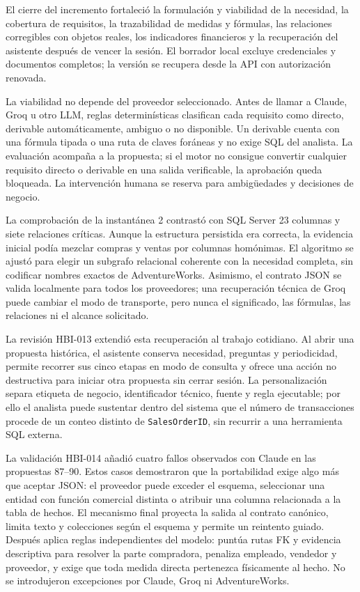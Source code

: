\documentclass[11pt,letterpaper]{article}
\newcommand{\file}[1]{\texttt{#1}}
\begin{document}
El cierre del incremento fortaleció la formulación y viabilidad de la necesidad, la cobertura de requisitos, la trazabilidad de medidas y fórmulas, las relaciones corregibles con objetos reales, los indicadores financieros y la recuperación del asistente después de vencer la sesión. El borrador local excluye credenciales y documentos completos; la versión se recupera desde la API con autorización renovada.

La viabilidad no depende del proveedor seleccionado. Antes de llamar a Claude, Groq u otro LLM, reglas determinísticas clasifican cada requisito como directo, derivable automáticamente, ambiguo o no disponible. Un derivable cuenta con una fórmula tipada o una ruta de claves foráneas y no exige SQL del analista. La evaluación acompaña a la propuesta; si el motor no consigue convertir cualquier requisito directo o derivable en una salida verificable, la aprobación queda bloqueada. La intervención humana se reserva para ambigüedades y decisiones de negocio.

La comprobación de la instantánea 2 contrastó con SQL Server 23 columnas y siete relaciones críticas. Aunque la estructura persistida era correcta, la evidencia inicial podía mezclar compras y ventas por columnas homónimas. El algoritmo se ajustó para elegir un subgrafo relacional coherente con la necesidad completa, sin codificar nombres exactos de AdventureWorks. Asimismo, el contrato JSON se valida localmente para todos los proveedores; una recuperación técnica de Groq puede cambiar el modo de transporte, pero nunca el significado, las fórmulas, las relaciones ni el alcance solicitado.

La revisión HBI-013 extendió esta recuperación al trabajo cotidiano. Al abrir una propuesta histórica, el asistente conserva necesidad, preguntas y periodicidad, permite recorrer sus cinco etapas en modo de consulta y ofrece una acción no destructiva para iniciar otra propuesta sin cerrar sesión. La personalización separa etiqueta de negocio, identificador técnico, fuente y regla ejecutable; por ello el analista puede sustentar dentro del sistema que el número de transacciones procede de un conteo distinto de \file{SalesOrderID}, sin recurrir a una herramienta SQL externa.

La validación HBI-014 añadió cuatro fallos observados con Claude en las propuestas 87--90. Estos casos demostraron que la portabilidad exige algo más que aceptar JSON: el proveedor puede exceder el esquema, seleccionar una entidad con función comercial distinta o atribuir una columna relacionada a la tabla de hechos. El mecanismo final proyecta la salida al contrato canónico, limita texto y colecciones según el esquema y permite un reintento guiado. Después aplica reglas independientes del modelo: puntúa rutas FK y evidencia descriptiva para resolver la parte compradora, penaliza empleado, vendedor y proveedor, y exige que toda medida directa pertenezca físicamente al hecho. No se introdujeron excepciones por Claude, Groq ni AdventureWorks.
\end{document}
